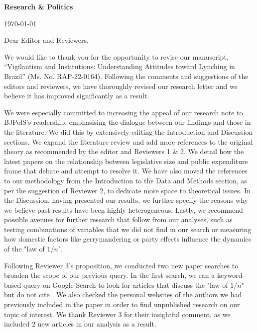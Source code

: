 \documentclass[a4paper,12pt]{article}
\begin{document}
\doublespacing

\noindent \textbf{Research \& Politics}

\noindent \today 

\vspace{.5cm}

\noindent Dear Editor and Reviewers,

\vspace{.5cm}

We would like to thank you for the opportunity to revise our manuscript,
``Vigilantism and Institutions: Understanding Attitudes toward Lynching in
Brazil'' (Ms. No. RAP-22-0164). Following the comments and suggestions of the
editors and reviewers, we have thoroughly revised our research letter and we
believe it has improved significantly as a result. 




We were especially committed to increasing the appeal of our research note to BJPolS's readership, emphasising the dialogue between our findings and those in the literature. We did this by extensively editing the Introduction and Discussion sections. We expand the literature review and add more references to the original theory as recommended by the editor and Reviewers 1 \& 2. We detail how the latest papers on the relationship between legislative size and public expenditure frame that debate and attempt to resolve it. We have also moved the references to our methodology from the Introduction to the Data and Methods section, as per the suggestion of Reviewer 2, to dedicate more space to theoretical issues. In the Discussion, having presented our results, we further specify the reasons why we believe past results have been highly heterogeneous. Lastly, we recommend possible avenues for further research that follow from our analyses, such as testing combinations of variables that we did not find in our search or measuring how domestic factors like gerrymandering or party effects influence the dynamics of the "law of $1/n$".

Following Reviewer 3's proposition, we conducted two new paper searches to broaden the scope of our previous query. In the first search, we ran a keyword-based query on Google Search to look for articles that discuss the "law of $1/n$" but do not cite \citet{weingast1981political}. We also checked the personal websites of the authors we had previously included in the paper in order to find unpublished research on our topic of interest. We thank Reviewer 3 for their insightful comment, as we included 2 new articles in our analysis as a result.
\end{document}
